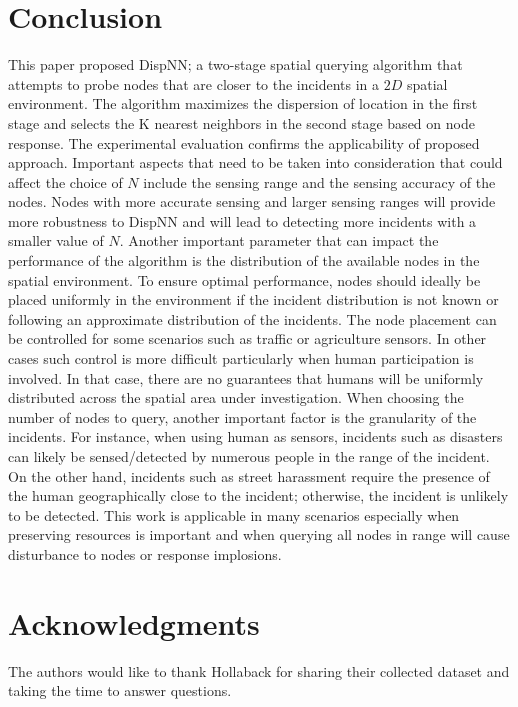 \documentclass{acm_proc_article-sp}
\begin{document}
\section{Conclusion}
This paper proposed DispNN; a two-stage spatial querying algorithm that attempts to probe nodes that are closer to the incidents in a $2D$ spatial environment. The algorithm maximizes the dispersion of location in the first stage and selects the K nearest neighbors in the second stage based on node response. The experimental evaluation confirms the applicability of proposed approach.
Important aspects that need to be taken into consideration that could affect the choice of $N$ include the sensing range and the sensing accuracy of the nodes. Nodes with more accurate sensing and larger sensing ranges will provide more robustness to DispNN and will lead to detecting more incidents with a smaller value of $N$. Another important parameter that can impact the performance of the algorithm is the distribution of the available nodes in the spatial environment. To ensure optimal performance, nodes should ideally be placed uniformly in the environment if the incident distribution is not known or following an approximate distribution of the incidents. The node placement can be controlled for some scenarios such as traffic or agriculture sensors. In other cases such control is more difficult particularly when human participation is involved. In that case, there are no guarantees that humans will be uniformly distributed across the spatial area under investigation. When choosing the number of nodes to query, another important factor is the granularity of the incidents. For instance, when using human as sensors, incidents such as disasters can likely be sensed/detected by numerous people in the range of the incident. On the other hand, incidents such as street harassment require the presence of the human geographically close to the incident; otherwise, the incident is unlikely to be detected. This work is applicable in many scenarios especially when preserving resources is important and when querying all nodes in range will cause disturbance to nodes or response implosions.  

\section{Acknowledgments}
The authors would like to thank Hollaback for sharing their collected dataset and taking the time to answer questions.

{\footnotesize
}  %
%
%
\end{document}

